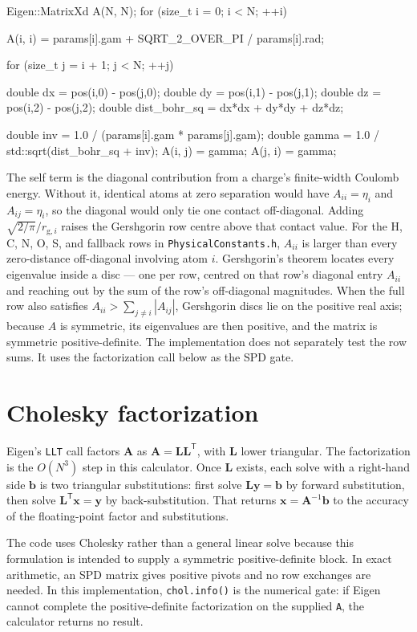 \documentclass[11pt]{article}
\newcommand{\code}[1]{\texttt{#1}}
\begin{document}
\begin{codebox}
Eigen::MatrixXd A(N, N);
for (size_t i = 0; i < N; ++i) {
    A(i, i) = params[i].gam + SQRT_2_OVER_PI / params[i].rad;

    for (size_t j = i + 1; j < N; ++j) {
        double dx = pos(i,0) - pos(j,0);
        double dy = pos(i,1) - pos(j,1);
        double dz = pos(i,2) - pos(j,2);
        double dist_bohr_sq = dx*dx + dy*dy + dz*dz;

        double inv = 1.0 / (params[i].gam * params[j].gam);
        double gamma = 1.0 / std::sqrt(dist_bohr_sq + inv);
        A(i, j) = gamma;
        A(j, i) = gamma;
    }
}
\end{codebox}

The self term is the diagonal contribution from a charge's finite-width Coulomb
energy. Without it, identical atoms at zero separation would have
\(A_{ii}=\eta_i\) and \(A_{ij}=\eta_i\), so the diagonal would only tie one
contact off-diagonal. Adding \(\sqrt{2/\pi}/r_{\mathrm g,i}\) raises the
Gershgorin row centre above that contact value. For the H, C, N, O, S, and
fallback rows in \code{PhysicalConstants.h}, \(A_{ii}\) is larger than every
zero-distance off-diagonal involving atom \(i\). Gershgorin's theorem locates
every eigenvalue inside a disc --- one per row, centred on that row's diagonal
entry \(A_{ii}\) and reaching out by the sum of the row's off-diagonal
magnitudes. When the full row also
satisfies \(A_{ii}>\sum_{j\ne i}|A_{ij}|\), Gershgorin discs lie on the
positive real axis; because \(A\) is symmetric, its eigenvalues are then
positive, and the matrix is symmetric positive-definite. The implementation
does not separately test the row sums. It uses the factorization call below as
the SPD gate.

\section{Cholesky factorization}

Eigen's \code{LLT} call factors \(\bm A\) as
\(\bm A=\bm L\bm L^{\mathsf T}\), with \(\bm L\) lower triangular. The
factorization is the \(O(N^3)\) step in this calculator. Once \(\bm L\) exists,
each solve with a right-hand side \(\bm b\) is two triangular substitutions:
first solve \(\bm L\bm y=\bm b\) by forward substitution, then solve
\(\bm L^{\mathsf T}\bm x=\bm y\) by back-substitution. That returns
\(\bm x=\bm A^{-1}\bm b\) to the accuracy of the floating-point factor and
substitutions.

The code uses Cholesky rather than a general linear solve because this
formulation is intended to supply a symmetric positive-definite block. In exact
arithmetic, an SPD matrix gives positive pivots and no row exchanges are needed.
In this implementation, \code{chol.info()} is the numerical gate: if Eigen
cannot complete the positive-definite factorization on the supplied \code{A},
the calculator returns no result.
\end{document}
